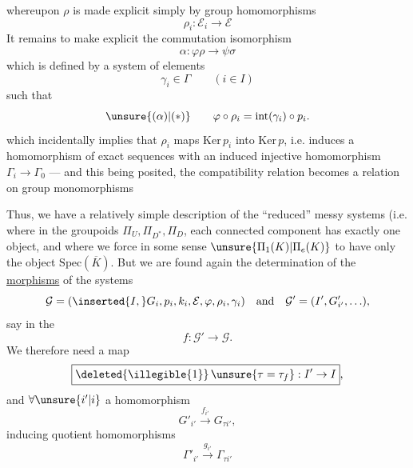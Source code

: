 
whereupon $\rho$ is made explicit simply by
group homomorphisms
\[
\boxed{\rho_i:\mathcal E_i\longrightarrow\mathcal E}
\]
It remains to make explicit the commutation isomorphism
\[
\alpha:\varphi\rho\to\psi\sigma
\]
which is defined by a system of elements
\[
\boxed{\gamma_i\in\Gamma\qquad(i\in I)}
\]
such that
\[
\unsure{(\alpha)|(*)}\qquad
\varphi\circ\rho_i=\mathrm{int}(\gamma_i)\circ p_i.
\]
which incidentally implies that $\rho_i$ 
maps $\mathrm{Ker}\,p_i$ into $\mathrm{Ker}\,p$, i.e. induces
a homomorphism of exact sequences
with an induced injective homomorphism $\Gamma_i\to\Gamma_0$
--- and this being posited, the compatibility relation
\unsure{$(\alpha)$|$(*)$} becomes a relation on
group monomorphisms



Thus, we have a relatively simple description of the
``reduced'' messy systems (i.e. where in the groupoids
$\Pi_U,\Pi_{D^*},\Pi_D$, each connected component has exactly
one object, and where  we force in some sense
$\unsure{\Pi_1(K)|\Pi_e(K)}$ to have only the object
$\mathrm{Spec}(\overline K)$.
But we are found again 
 the determination of the \uline{morphisms} of the systems
\[
\mathcal G=(\inserted{I,}G_i,p_i,k_i,\mathcal E,\varphi,\rho_i,
\gamma_i)
\quad\hbox{and}\quad
\mathcal G'=(I',G'_{i'},\ldots),
\]
 say in the 
\[
f:\mathcal G'\to\mathcal G.
\]
We therefore need  a map
\[
\boxed{\deleted{\illegible{1}}\,\unsure{\tau=\tau_f}:I'\to I},
\]
and $\forall\unsure{i'|i}$ a homomorphism
\[
\boxed{G'_{i'}\xrightarrow{f_{i'}}G_{\tau i'}},
\]
inducing  quotient homomorphisms
\[
\Gamma'_{i'}\xrightarrow{g_{i'}}\Gamma_{\tau i'}
\]

